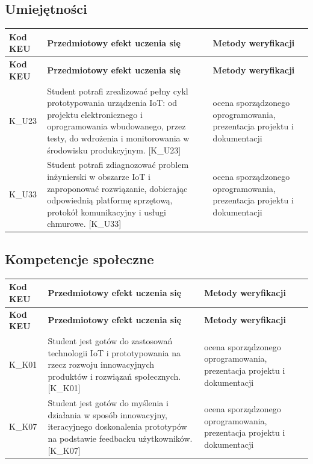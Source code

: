 \documentclass[12pt, a4paper]{article}
\newcommand{\thdrule}{\noalign{\global\setlength{\extrarowheight}{0pt}}}
\newcommand{\thdend}{\noalign{\global\setlength{\extrarowheight}{3pt}}}
\begin{document}
\subsection*{Umiejętności}
{\scriptsize
\begin{longtable}{m{1.6cm}m{9.0cm}m{4.2cm}}
\thdrule\toprule
\rowcolor{pjatkRed} {\color{white}\footnotesize\textbf{\vphantom{Ag}Kod KEU}} & {\color{white}\footnotesize\textbf{\vphantom{Ag}Przedmiotowy efekt uczenia się}} & {\color{white}\footnotesize\textbf{\vphantom{Ag}Metody weryfikacji}} \\
\midrule\thdend
\endfirsthead
\thdrule\toprule
\rowcolor{pjatkRed} {\color{white}\footnotesize\textbf{\vphantom{Ag}Kod KEU}} & {\color{white}\footnotesize\textbf{\vphantom{Ag}Przedmiotowy efekt uczenia się}} & {\color{white}\footnotesize\textbf{\vphantom{Ag}Metody weryfikacji}} \\
\midrule\thdend
\endhead
  \rowcolor{tableRowLight} K\_U23 & Student potrafi zrealizować pełny cykl prototypowania urządzenia IoT: od projektu elektronicznego i oprogramowania wbudowanego, przez testy, do wdrożenia i monitorowania w środowisku produkcyjnym. {[}K\_U23{]} & ocena sporządzonego oprogramowania, prezentacja projektu i dokumentacji \\
  \rowcolor{tableRowAlt} K\_U33 & Student potrafi zdiagnozować problem inżynierski w obszarze IoT i zaproponować rozwiązanie, dobierając odpowiednią platformę sprzętową, protokół komunikacyjny i usługi chmurowe. {[}K\_U33{]} & ocena sporządzonego oprogramowania, prezentacja projektu i dokumentacji \\
\bottomrule
\end{longtable}}

\subsection*{Kompetencje społeczne}
{\scriptsize
\begin{longtable}{m{1.6cm}m{9.0cm}m{4.2cm}}
\thdrule\toprule
\rowcolor{pjatkRed} {\color{white}\footnotesize\textbf{\vphantom{Ag}Kod KEU}} & {\color{white}\footnotesize\textbf{\vphantom{Ag}Przedmiotowy efekt uczenia się}} & {\color{white}\footnotesize\textbf{\vphantom{Ag}Metody weryfikacji}} \\
\midrule\thdend
\endfirsthead
\thdrule\toprule
\rowcolor{pjatkRed} {\color{white}\footnotesize\textbf{\vphantom{Ag}Kod KEU}} & {\color{white}\footnotesize\textbf{\vphantom{Ag}Przedmiotowy efekt uczenia się}} & {\color{white}\footnotesize\textbf{\vphantom{Ag}Metody weryfikacji}} \\
\midrule\thdend
\endhead
  \rowcolor{tableRowLight} K\_K01 & Student jest gotów do zastosowań technologii IoT i prototypowania na rzecz rozwoju innowacyjnych produktów i rozwiązań społecznych. {[}K\_K01{]} & ocena sporządzonego oprogramowania, prezentacja projektu i dokumentacji \\
  \rowcolor{tableRowAlt} K\_K07 & Student jest gotów do myślenia i działania w sposób innowacyjny, iteracyjnego doskonalenia prototypów na podstawie feedbacku użytkowników. {[}K\_K07{]} & ocena sporządzonego oprogramowania, prezentacja projektu i dokumentacji \\
\bottomrule
\end{longtable}}
\end{document}
